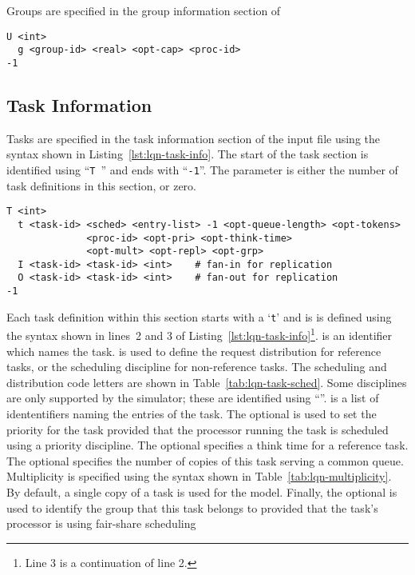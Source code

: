 Groups are specified in the group information section of

\begin{lstlisting}[caption={Group Information},label=lst:lqn-group-info,frame=single,firstnumber=1]
U <int>
  g <group-id> <real> <opt-cap> <proc-id>
-1
\end{lstlisting}

\subsection{Task Information}
\label{sec:lqn-task-information}

Tasks are specified in the task information section of the input file using the syntax
shown in Listing~\ref{lst:lqn-task-info}.  The start of the task section is identified using
``\texttt{T}~'' and ends with ``\texttt{-1}''.  The  parameter is either
the number of task definitions in this section, or zero.

\begin{lstlisting}[caption={Task Information},label=lst:lqn-task-info,frame=single,firstnumber=1]
T <int>
  t <task-id> <sched> <entry-list> -1 <opt-queue-length> <opt-tokens>  
              <proc-id> <opt-pri> <opt-think-time>
              <opt-mult> <opt-repl> <opt-grp>
  I <task-id> <task-id> <int>    # fan-in for replication
  O <task-id> <task-id> <int>    # fan-out for replication
-1
\end{lstlisting}

Each task definition within this section starts with a `\texttt{t}' and is is defined using the syntax shown
in lines~2 and 3 of Listing~\ref{lst:lqn-task-info}\footnote{Line 3 is a continuation of line 2.}.
 is an identifier which names the task.   is used to define the
request distribution for reference tasks, or the scheduling discipline for
non-reference tasks.  The scheduling and distribution code letters are shown in
Table~\ref{tab:lqn-task-sched}.  Some disciplines are only supported by the simulator; these are identified
using ``\dag''.   is a list of idententifiers naming the entries of the task.  The
optional  is used to set the priority for the task provided that the processor running
the task is scheduled using a priority discipline.  The optional  specifies a
think time for a reference task.  The optional  specifies the number
of copies of this task serving a common queue.  Multiplicity is specified using the syntax shown in
Table~\ref{tab:lqn-multiplicity}.  By default, a single copy of a task is used for the model. Finally, the
optional  is used to identify the group that this task belongs to provided that the
task's processor is using fair-share scheduling


